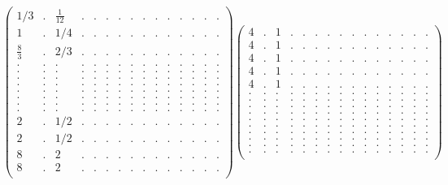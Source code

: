 \documentclass[12pt,a4paper]{amsart}
\begin{document}
\begin{align*}
\left(\begin{array}{rrrrrrrrrrrrrrr}%
1/3&.&\frac{1}{12}&.&.&.&.&.&.&.&.&.&.&.&.\\%
1&.&1/4&.&.&.&.&.&.&.&.&.&.&.&.\\%
\frac{8}{3}&.&2/3&.&.&.&.&.&.&.&.&.&.&.&.\\%
.&.&.&.&.&.&.&.&.&.&.&.&.&.&.\\%
.&.&.&.&.&.&.&.&.&.&.&.&.&.&.\\%
.&.&.&.&.&.&.&.&.&.&.&.&.&.&.\\%
.&.&.&.&.&.&.&.&.&.&.&.&.&.&.\\%
.&.&.&.&.&.&.&.&.&.&.&.&.&.&.\\%
.&.&.&.&.&.&.&.&.&.&.&.&.&.&.\\%
.&.&.&.&.&.&.&.&.&.&.&.&.&.&.\\%
.&.&.&.&.&.&.&.&.&.&.&.&.&.&.\\%
2&.&1/2&.&.&.&.&.&.&.&.&.&.&.&.\\%
2&.&1/2&.&.&.&.&.&.&.&.&.&.&.&.\\%
8&.&2&.&.&.&.&.&.&.&.&.&.&.&.\\%
8&.&2&.&.&.&.&.&.&.&.&.&.&.&.\\%
\end{array}\right)%
\left(\begin{array}{rrrrrrrrrrrrrrr}%
4&.&1&.&.&.&.&.&.&.&.&.&.&.&.\\%
4&.&1&.&.&.&.&.&.&.&.&.&.&.&.\\%
4&.&1&.&.&.&.&.&.&.&.&.&.&.&.\\%
4&.&1&.&.&.&.&.&.&.&.&.&.&.&.\\%
4&.&1&.&.&.&.&.&.&.&.&.&.&.&.\\%
.&.&.&.&.&.&.&.&.&.&.&.&.&.&.\\%
.&.&.&.&.&.&.&.&.&.&.&.&.&.&.\\%
.&.&.&.&.&.&.&.&.&.&.&.&.&.&.\\%
.&.&.&.&.&.&.&.&.&.&.&.&.&.&.\\%
.&.&.&.&.&.&.&.&.&.&.&.&.&.&.\\%
.&.&.&.&.&.&.&.&.&.&.&.&.&.&.\\%
.&.&.&.&.&.&.&.&.&.&.&.&.&.&.\\%
.&.&.&.&.&.&.&.&.&.&.&.&.&.&.\\%
.&.&.&.&.&.&.&.&.&.&.&.&.&.&.\\%
.&.&.&.&.&.&.&.&.&.&.&.&.&.&.\\%
\end{array}\right)%
\end{align*}
\end{document}
